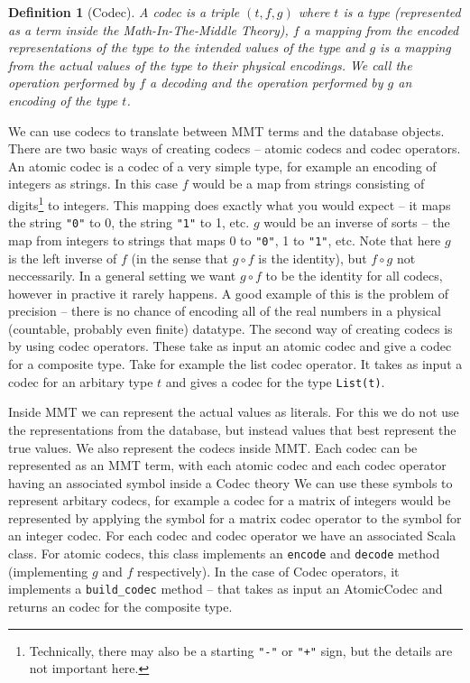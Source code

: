 \documentclass{deliverablereport}
\newtheorem{mydef}{Definition}
\begin{document}
\begin{mydef}[Codec]
A codec is a triple $(t, f, g)$ where $t$ is a type (represented as a term inside the Math-In-The-Middle Theory), $f$ a mapping from the encoded representations of the type to the intended values of the type and $g$ is a mapping from the actual values of the type to their physical encodings. We call the operation performed by $f$ a decoding and the operation performed by $g$ an encoding of the type $t$.
\end{mydef}

We can use codecs to translate between MMT terms and the database objects. There are two basic ways of creating codecs -- atomic codecs and codec operators. An atomic codec is a codec of a very simple type, for example an encoding of integers as strings. In this case $f$ would be a map from strings consisting of digits\footnote{Technically, there may also be a starting \texttt{"-"} or \texttt{"+"} sign, but the details are not important here. } to integers. This mapping does exactly what you would expect -- it maps the string \texttt{"0"} to 0, the string \texttt{"1"} to 1, etc. $g$ would be an inverse of sorts -- the map from integers to strings that maps 0 to \texttt{"0"}, 1 to \texttt{"1"}, etc. Note that here $g$ is the left inverse of $f$ (in the sense that $g \circ f$ is the identity), but $f \circ g$ not neccessarily. In a general setting we want $g \circ f$ to be the identity for all codecs, however in practive it rarely happens. A good example of this is the problem of precision -- there is no chance of encoding all of the real numbers in a physical (countable, probably even finite) datatype.
The second way of creating codecs is by using codec operators. These take as input an atomic codec and give a codec for a composite type. Take for example the list codec operator. It takes as input a codec for an arbitary type $t$ and gives a codec for the type \texttt{List(t)}.

Inside MMT we can represent the actual values as literals. For this we do not use the representations from the database, but instead values that best represent the true values. We also represent the codecs inside MMT. Each codec can be represented as an MMT term, with each atomic codec  and each codec operator having an associated symbol inside a Codec theory We can use these symbols to represent arbitary codecs, for example a codec for a matrix of integers would be represented by applying the symbol for a matrix codec operator to the symbol for an integer codec. For each codec and codec operator we have an associated Scala class. For atomic codecs, this class implements an \texttt{encode} and \texttt{decode} method (implementing $g$ and $f$ respectively). In the case of Codec operators, it implements a \texttt{build\_codec} method -- that takes as input an AtomicCodec and returns an codec for the composite type.
\end{document}
